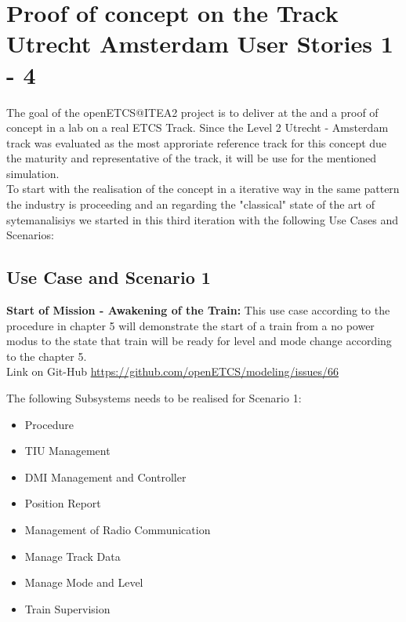 
\section{Proof of concept on the Track Utrecht Amsterdam User Stories 1 - 4}

The goal of the openETCS@ITEA2 project is to deliver at the and a proof of concept in a lab on a real ETCS Track. Since the Level 2 Utrecht - Amsterdam track was evaluated as the most approriate reference track for this concept due the maturity and representative of the track, it will be use for the mentioned simulation.\\

To start with the realisation of the concept in a iterative way in the same pattern the industry is proceeding and an regarding the "classical" state of the art of sytemanalisiys we started in this third iteration with the following Use Cases and Scenarios:\\

\subsection{Use Case and Scenario 1}
\textbf{Start of Mission - Awakening of the Train:}
This use case according to the procedure in chapter 5 will demonstrate the start of a train from a no power modus to the state that train will be ready for level and mode change according to the chapter 5.\\ 
Link on Git-Hub \url{https://github.com/openETCS/modeling/issues/66}

The following Subsystems needs to be realised for Scenario 1:\\
\begin{itemize}
\item Procedure
\item TIU Management
\item DMI Management and Controller
\item Position Report
\item Management of Radio Communication
\item Manage Track Data
\item Manage Mode and Level
\item Train Supervision
\end{itemize}

